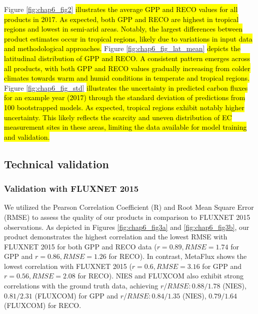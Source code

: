Figure \ref{fig:chap6_fig2} \hl{illustrates the average GPP and RECO values for all products in 2017. As expected, both GPP and RECO are highest in tropical regions and lowest in semi-arid areas. Notably, the largest differences between product estimates occur in tropical regions, likely due to variations in input data and methodological approaches.} Figure \ref{fig:chap6_fig_lat_mean} \hl{depicts the latitudinal distribution of GPP and RECO. A consistent pattern emerges across all products, with both GPP and RECO values gradually increasing from colder climates towards warm and humid conditions in temperate and tropical regions.} Figure \ref{fig:chap6_fig_std} \hl{illustrates the uncertainty in predicted carbon fluxes for an example year (2017) through the standard deviation of predictions from 100 bootstrapped models. As expected, tropical regions exhibit notably higher uncertainty. This likely reflects the scarcity and uneven distribution of EC measurement sites in these areas, limiting the data available for model training and validation.} \par

\subsection{Technical validation}
\subsubsection{Validation with FLUXNET 2015}
We utilized the Pearson Correlation Coefficient (R) and Root Mean Square Error (RMSE) to assess the quality of our products in comparison to FLUXNET 2015 observations. As depicted in Figures \ref{fig:chap6_fig3a} and \ref{fig:chap6_fig3b}, our product demonstrates the highest correlation and the lowest RMSE with FLUXNET 2015 for both GPP and RECO data ($r = 0.89, RMSE = 1.74$ for GPP and $r = 0.86, RMSE = 1.26$ for RECO). In contrast, MetaFlux shows the lowest correlation with FLUXNET 2015 ($r = 0.6, RMSE = 3.16$ for GPP and $r = 0.56, RMSE = 2.08$ for RECO). NIES and FLUXCOM also exhibit strong correlations with the ground truth data, achieving $r/RMSE: 0.88/1.78$ (NIES), $0.81/2.31$ (FLUXCOM) for GPP and $r/RMSE: 0.84/1.35$ (NIES), $0.79/1.64$ (FLUXCOM) for RECO. \par

